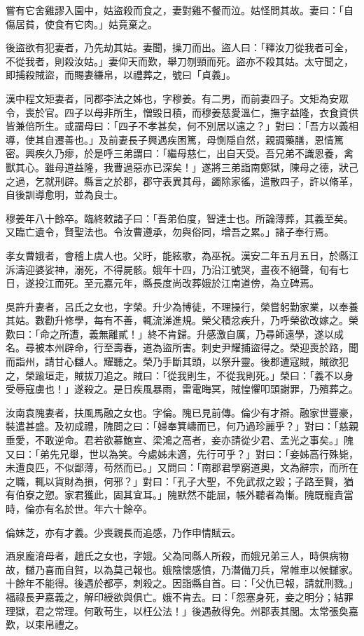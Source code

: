 \begin{pinyinscope}
嘗有它舍雞謬入園中，姑盜殺而食之，妻對雞不餐而泣。姑怪問其故。妻曰：「自傷居貧，使食有它肉。」姑竟棄之。

後盜欲有犯妻者，乃先劫其姑。妻聞，操刀而出。盜人曰：「釋汝刀從我者可全，不從我者，則殺汝姑。」妻仰天而歎，舉刀刎頸而死。盜亦不殺其姑。太守聞之，即捕殺賊盜，而賜妻縑帛，以禮葬之，號曰「貞義」。

漢中程文矩妻者，同郡李法之姊也，字穆姜。有二男，而前妻四子。文矩為安眾令，喪於官。四子以母非所生，憎毀日積，而穆姜慈愛溫仁，撫字益隆，衣食資供皆兼倍所生。或謂母曰：「四子不孝甚矣，何不別居以遠之？」對曰：「吾方以義相導，使其自遷善也。」及前妻長子興遇疾困篤，母惻隱自然，親調藥膳，恩情篤密。興疾久乃瘳，於是呼三弟謂曰：「繼母慈仁，出自天受。吾兄弟不識恩養，禽獸其心。雖母道益隆，我曹過惡亦已深矣！」遂將三弟詣南鄭獄，陳母之德，狀己之過，乞就刑辟。縣言之於郡，郡守表異其母，蠲除家徭，遣散四子，許以脩革，自後訓導愈明，並為良士。

穆姜年八十餘卒。臨終敕諸子曰：「吾弟伯度，智達士也。所論薄葬，其義至矣。又臨亡遺令，賢聖法也。令汝曹遵承，勿與俗同，增吾之累。」諸子奉行焉。

孝女曹娥者，會稽上虞人也。父盱，能絃歌，為巫祝。漢安二年五月五日，於縣江泝濤迎婆娑神，溺死，不得屍骸。娥年十四，乃沿江號哭，晝夜不絕聲，旬有七日，遂投江而死。至元嘉元年，縣長度尚改葬娥於江南道傍，為立碑焉。

吳許升妻者，呂氏之女也，字榮。升少為博徒，不理操行，榮嘗躬勤家業，以奉養其姑。數勸升修學，每有不善，輒流涕進規。榮父積忿疾升，乃呼榮欲改嫁之。榮歎曰：「命之所遭，義無離貳！」終不肯歸。升感激自厲，乃尋師遠學，遂以成名。尋被本州辟命，行至壽春，道為盜所害。刺史尹耀捕盜得之。榮迎喪於路，聞而詣州，請甘心讎人。耀聽之。榮乃手斷其頭，以祭升靈。後郡遭寇賊，賊欲犯之，榮踰垣走，賊拔刀追之。賊曰：「從我則生，不從我則死。」榮曰：「義不以身受辱寇虜也！」遂殺之。是日疾風暴雨，雷電晦冥，賊惶懼叩頭謝罪，乃殯葬之。

汝南袁隗妻者，扶風馬融之女也。字倫。隗已見前傳。倫少有才辯。融家世豐豪，裝遣甚盛。及初成禮，隗問之曰：「婦奉箕嶹而已，何乃過珍麗乎？」對曰：「慈親垂愛，不敢逆命。君若欲慕鮑宣、梁鴻之高者，妾亦請從少君、孟光之事矣。」隗又曰：「弟先兄舉，世以為笑。今處姊未適，先行可乎？」對曰：「妾姊高行殊毙，未遭良匹，不似鄙薄，苟然而已。」又問曰：「南郡君學窮道奧，文為辭宗，而所在之職，輒以貨財為損，何邪？」對曰：「孔子大聖，不免武叔之毀；子路至賢，猶有伯寮之愬。家君獲此，固其宜耳。」隗默然不能屈，帳外聽者為慚。隗既寵貴當時，倫亦有名於世。年六十餘卒。

倫妹芝，亦有才義。少喪親長而追感，乃作申情賦云。

酒泉龐淯母者，趙氏之女也，字娥。父為同縣人所殺，而娥兄弟三人，時俱病物故，讎乃喜而自賀，以為莫己報也。娥陰懷感憤，乃潛備刀兵，常帷車以候讎家。十餘年不能得。後遇於都亭，刺殺之。因詣縣自首。曰：「父仇已報，請就刑戮。」福祿長尹嘉義之，解印綬欲與俱亡。娥不肯去。曰：「怨塞身死，妾之明分；結罪理獄，君之常理。何敢苟生，以枉公法！」後遇赦得免。州郡表其閭。太常張奐嘉歎，以束帛禮之。


\end{pinyinscope}
